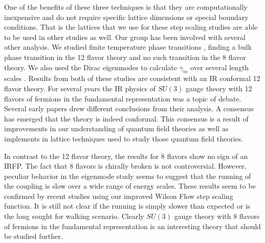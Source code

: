 One of the benefits of these three techniques is that they are computationally inexpensive and do not require specific lattice dimensions or special boundary conditions.
That is the lattices that we use for these step scaling studies are able to be used in other studies as well.
Our group has been involved with several other analysis.
We studied finite temperature phase transitions \cite{Schaich:2012fr}, finding a bulk phase transition in the 12 flavor theory and no such transition in the 8 flavor theory.
We also used the Dirac eigenmodes to calculate $\gamma_m$ over several length scales \cite{Cheng:2013bca,Cheng:2013eu}.
Results from both of these studies are consistent with an IR conformal 12 flavor theory.
For several years the IR physics of $SU(3)$ gauge theory with 12 flavors of fermions in the fundamental representation was a topic of debate.
Several early papers drew different conclusions from their analysis.
A consensus has emerged that the theory is indeed conformal.
This consensus is a result of improvements in our understanding of quantum field theories as well as implements in lattice techniques used to study those quantum field theories.

In contrast to the 12 flavor theory, the results for 8 flavors show no sign of an IRFP.
The fact that 8 flavors is chirally broken is not controversial.
However, peculiar behavior in the eigenmode study seems to suggest that the running of the coupling is slow over a wide range of energy scales.
These results seem to be confirmed by recent studies using our improved Wilson Flow step scaling function.
It is still not clear if the running is simply slower than expected or is the long sought for walking scenario.
Clearly $SU(3)$ gauge theory with 8 flavors of fermions in the fundamental representation is an interesting theory that should be studied further.
